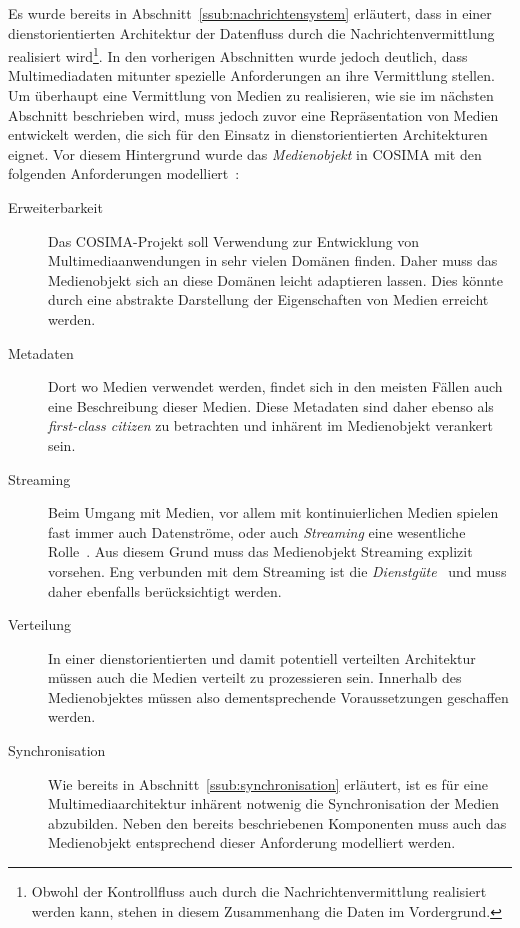   Es wurde bereits in Abschnitt~\ref{ssub:nachrichtensystem} erläutert, dass in einer dienstorientierten Architektur der Datenfluss durch die Nachrichtenvermittlung realisiert wird\footnote{Obwohl der Kontrollfluss auch durch die Nachrichtenvermittlung realisiert werden kann, stehen in diesem Zusammenhang die Daten im Vordergrund.}. In den vorherigen Abschnitten wurde jedoch deutlich, dass Multimediadaten mitunter spezielle Anforderungen an ihre Vermittlung stellen. Um überhaupt eine Vermittlung von Medien zu realisieren, wie sie im nächsten Abschnitt beschrieben wird, muss jedoch zuvor eine Repräsentation von Medien entwickelt werden, die sich für den Einsatz in dienstorientierten Architekturen eignet. Vor diesem Hintergrund wurde das \emph{Medienobjekt} in COSIMA mit den folgenden Anforderungen modelliert~\citep[S. 34]{bericht}:
  
  \begin{description}
    \item[Erweiterbarkeit] Das COSIMA-Projekt soll Verwendung zur Entwicklung von Multimediaanwendungen in sehr vielen Domänen finden. Daher muss das Medienobjekt sich an diese Domänen leicht adaptieren lassen. Dies könnte durch eine abstrakte Darstellung der Eigenschaften von Medien erreicht werden.
    \item[Metadaten] Dort wo Medien verwendet werden, findet sich in den meisten Fällen auch eine Beschreibung dieser Medien. Diese Metadaten sind daher ebenso als \emph{first-class citizen} zu betrachten und inhärent im Medienobjekt verankert sein.
    \item[Streaming] Beim Umgang mit Medien, vor allem mit kontinuierlichen Medien spielen fast immer auch Datenströme, oder auch \emph{Streaming} eine wesentliche Rolle~\citep[S. 14ff]{multimedia_technologie}. Aus diesem Grund muss das Medienobjekt Streaming explizit vorsehen. Eng verbunden mit dem Streaming ist die \emph{Dienstgüte}~\citep{multimedia_technologie} und muss daher ebenfalls berücksichtigt werden.
    \item[Verteilung] In einer dienstorientierten und damit potentiell verteilten Architektur müssen auch die Medien verteilt zu prozessieren sein. Innerhalb des Medienobjektes müssen also dementsprechende Voraussetzungen geschaffen werden.
    \item[Synchronisation] Wie bereits in Abschnitt~\ref{ssub:synchronisation} erläutert, ist es für eine Multimediaarchitektur inhärent notwenig die Synchronisation der Medien abzubilden. Neben den bereits beschriebenen Komponenten muss auch das Medienobjekt entsprechend dieser Anforderung modelliert werden.
  \end{description}

